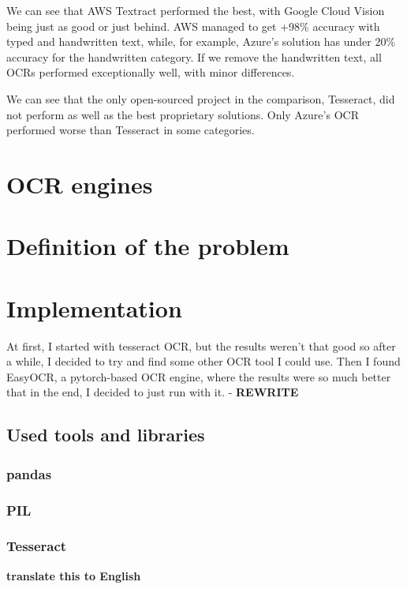 \documentclass[
  digital,     %
  oneside,     %
  nosansbold,  %
  nocolorbold, %
  nolof,         %
  nolot,         %
]{fithesis4}
\begin{document}
We can see that AWS Textract performed the best, with Google Cloud Vision being just as good or just behind. AWS managed to get +98\% accuracy with typed and handwritten text, while, for example, Azure's solution has under 20\% accuracy for the handwritten category. If we remove the handwritten text, all OCRs performed exceptionally well, with minor differences.

We can see that the only open-sourced project in the comparison, Tesseract, did not perform as well as the best proprietary solutions. Only Azure's OCR performed worse than Tesseract in some categories.

\chapter{OCR engines}

\chapter{Definition of the problem}

\chapter{Implementation}

At first, I started with tesseract OCR, but the results weren't that good so after a while, I decided to try and find some other OCR tool I could use. Then I found EasyOCR, a pytorch-based OCR engine, where the results were so much better that in the end, I decided to just run with it. - \textbf{REWRITE}

\section{Used tools and libraries}

\subsection{pandas}

\subsection{PIL}

\subsection{Tesseract}

\textbf{translate this to English}
\end{document}
